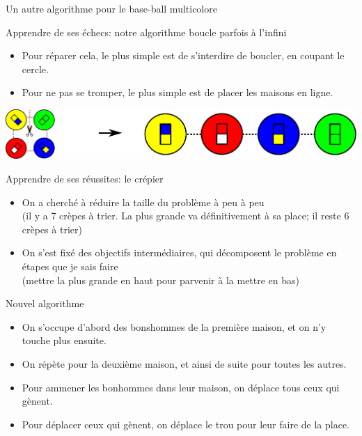 \begin{frame}{Un autre algorithme pour le base-ball multicolore}
  \begin{block}{Apprendre de ses échecs: {\color{black}notre algorithme boucle parfois à l'infini}}
    \begin{itemize}
    \item Pour réparer cela, le plus simple est de s'interdire de boucler, en
      coupant le cercle.
    \item Pour ne pas se tromper, le plus simple est de placer les maisons en ligne.
    \end{itemize}

    \begin{center}
      \includegraphics[width=0.8\linewidth]{img/baseball_ligne.pdf}
    \end{center}
  \end{block}

  \bigskip

  \begin{block}{Apprendre de ses réussites: {\color{black}le crépier}}
    \begin{itemize}
    \item On a cherché à réduire la taille du problème à peu à peu\\
      {(il y a 7 crèpes à trier. La plus grande va définitivement à sa place; il
        reste 6 crèpes à trier)}
    \item On s'est fixé des objectifs intermédiaires, qui décomposent le
      problème en étapes que je sais faire\\
      {(mettre la plus grande en haut pour parvenir à la mettre en bas)}
    \end{itemize}
  \end{block}

  \begin{block}{Nouvel algorithme}
    \begin{itemize}
    \item On s'occupe d'abord des bonshommes de la première maison, et on n'y touche plus ensuite.
    \item On répète pour la deuxième maison, et ainsi de suite pour toutes les autres.
    \item Pour ammener les bonhommes dans leur maison, on déplace tous ceux qui gènent.
    \item Pour déplacer ceux qui gènent, on déplace le trou pour leur faire de la place.
    \end{itemize}
  \end{block}


\end{frame}
